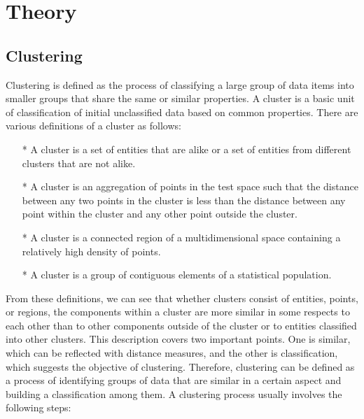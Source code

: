 \chapter{Theory}
\label{chap:Theory}

\section{Clustering}
Clustering is defined as the process of classifying a large group of data items into smaller groups that share the same or similar properties.
A cluster is a basic unit of classification of initial unclassified data based on common properties.  There are various definitions of a cluster as follows:
\begin{itemize}
\item[*] A cluster is a set of entities that are alike or a set of entities from different clusters that are not alike.
\item[*] A cluster is an aggregation of points in the test space such that the distance between any two points in the cluster is less than the distance between any point within the cluster and any other point outside the cluster.
\item[*] A cluster is a connected region of a multidimensional space containing a relatively high density of points.
\item[*] A cluster is a group of contiguous elements of a statistical population.
\end{itemize}
From these definitions, we can see that whether clusters consist of entities, points, or regions, the components within a cluster are more similar in some respects to each other than to other components outside of the cluster or to entities classified into other clusters.
This description covers two important points. One is similar, which can be reflected with distance measures, and the other is classification, which suggests the objective of clustering.
Therefore, clustering can be defined as a process of identifying groups of data that are similar in a certain aspect and building a classification among them.
A clustering process usually involves the following steps:
